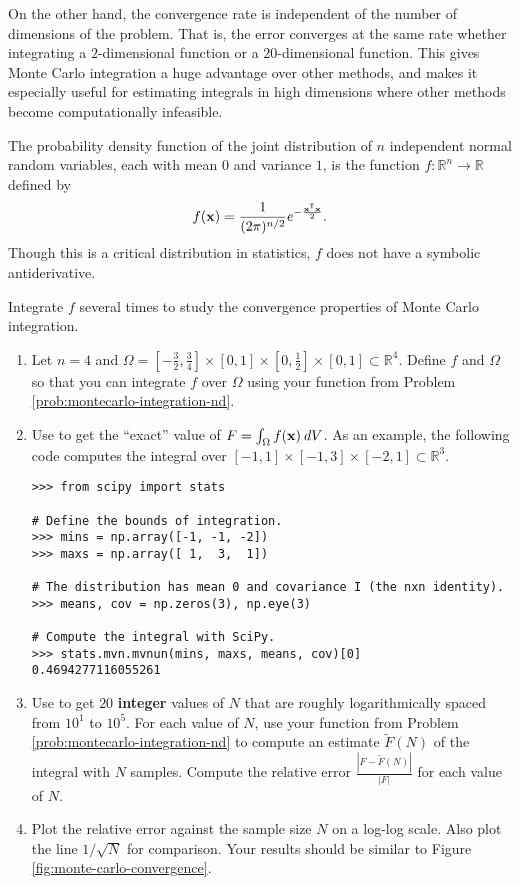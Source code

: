 On the other hand, the convergence rate is independent of the number of dimensions of the problem.
That is, the error converges at the same rate whether integrating a $2$-dimensional function or a $20$-dimensional function.
This gives Monte Carlo integration a huge advantage over other methods, and makes it especially useful for estimating integrals in high dimensions where other methods become computationally infeasible.

\begin{problem}
The probability density function of the joint distribution of $n$ independent normal random variables, each with mean $0$ and variance $1$, is the function $f:\mathbb{R}^n\rightarrow\mathbb{R}$ defined by
\[
f(\mathbf{x}) = \frac{1}{(2 \pi)^{n/2}} e^{- \frac{\mathbf{x}^{\mathsf T}\mathbf{x}}{2}}.
\]
Though this is a critical distribution in statistics, $f$ does not have a symbolic antiderivative.

Integrate $f$ several times to study the convergence properties of Monte Carlo integration.

\begin{enumerate}
\item Let $n=4$ and $\Omega=[-\frac{3}{2}, \frac{3}{4}]\times[0,1]\times[0, \frac{1}{2}]\times[0,1] \subset \mathbb{R}^4$.
Define $f$ and $\Omega$ so that you can integrate $f$ over $\Omega$ using your function from Problem \ref{prob:montecarlo-integration-nd}.

\item Use  to get the ``exact'' value of $F = \int_\Omega f(\mathbf{x})\:dV$.
As an example, the following code computes the integral over $[-1,1]\times [-1,3]\times[-2,1] \subset \mathbb{R}^3$.
\begin{lstlisting}
>>> from scipy import stats

# Define the bounds of integration.
>>> mins = np.array([-1, -1, -2])
>>> maxs = np.array([ 1,  3,  1])

# The distribution has mean 0 and covariance I (the nxn identity).
>>> means, cov = np.zeros(3), np.eye(3)

# Compute the integral with SciPy.
>>> stats.mvn.mvnun(mins, maxs, means, cov)[0]
0.4694277116055261
\end{lstlisting}

\item Use  to get $20$ \textbf{integer} values of $N$ that are roughly logarithmically spaced from $10^1$ to $10^5$.
For each value of $N$, use your function from Problem \ref{prob:montecarlo-integration-nd} to compute an estimate $\tilde{F}(N)$ of the integral with $N$ samples.
Compute the relative error $\frac{|F - \tilde{F}(N)|}{|F|}$ for each value of $N$.

\item Plot the relative error against the sample size $N$ on a log-log scale.
Also plot the line $1/\sqrt{N}$ for comparison.
Your results should be similar to Figure \ref{fig:monte-carlo-convergence}.
\end{enumerate}
\end{problem}


